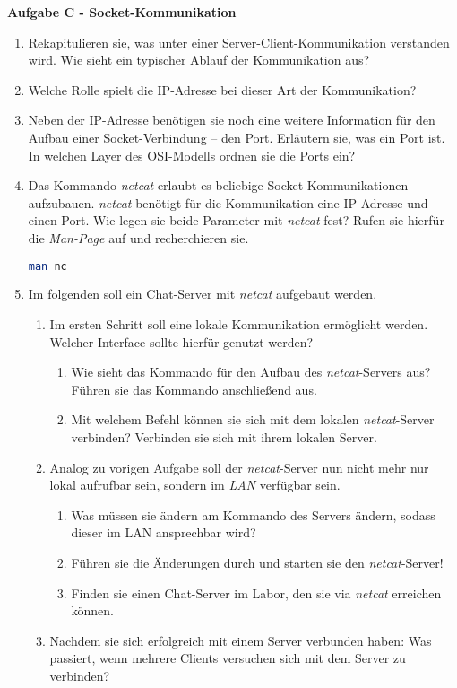 \documentclass[paper=a4,fontsize=11pt]{scrartcl}%
\numberwithin{equation}{section}
\begin{document}
\begin{center} \Large{\textbf{Aufgabe C - Socket-Kommunikation}} \end{center}
\begin{enumerate}
	\item Rekapitulieren sie, was unter einer Server-Client-Kommunikation verstanden wird. Wie sieht ein typischer Ablauf der Kommunikation aus?
	\item Welche Rolle spielt die IP-Adresse bei dieser Art der Kommunikation?
	\item Neben der IP-Adresse benötigen sie noch eine weitere Information für den Aufbau einer Socket-Verbindung -- den Port. Erläutern sie, was ein Port ist. In welchen Layer des OSI-Modells ordnen sie die Ports ein?
	\item Das Kommando \emph{netcat} erlaubt es beliebige Socket-Kommunikationen aufzubauen. \emph{netcat} benötigt für die Kommunikation eine IP-Adresse und einen Port. Wie legen sie beide Parameter mit \emph{netcat} fest? Rufen sie hierfür die \emph{Man-Page} auf und recherchieren sie.
	\begin{lstlisting}[style=Bash, language=Bash]
man nc
	\end{lstlisting}
	\item Im folgenden soll ein Chat-Server mit \emph{netcat} aufgebaut werden.
	\begin{enumerate}
		\item Im ersten Schritt soll eine lokale Kommunikation ermöglicht werden. Welcher Interface sollte hierfür genutzt werden?
		\begin{enumerate}
			\item Wie sieht das Kommando für den Aufbau des \emph{netcat}-Servers aus? Führen sie das Kommando anschließend aus.
			\item Mit welchem Befehl können sie sich mit dem lokalen \emph{netcat}-Server verbinden? Verbinden sie sich mit ihrem lokalen Server.
		\end{enumerate}
		\item Analog zu vorigen Aufgabe soll der \emph{netcat}-Server nun nicht mehr nur lokal aufrufbar sein, sondern im \emph{LAN} verfügbar sein.
		\begin{enumerate}
			\item Was müssen sie ändern am Kommando des Servers ändern, sodass dieser im LAN ansprechbar wird?
			\item Führen sie die Änderungen durch und starten sie den \emph{netcat}-Server!
			\item Finden sie einen Chat-Server im Labor, den sie via \emph{netcat} erreichen können.
		\end{enumerate}
		\item Nachdem sie sich erfolgreich mit einem Server verbunden haben: Was passiert, wenn mehrere Clients versuchen sich mit dem Server zu verbinden?
	\end{enumerate}
\end{enumerate}




\printbibliography
\end{document}
